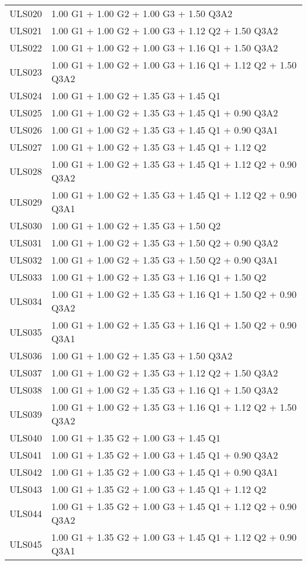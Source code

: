 \begin{center}
\begin{small}
\begin{longtable}{|l|p{10cm}|}
ULS020 & 1.00 G1 + 1.00 G2 + 1.00 G3 + 1.50 Q3A2\\
ULS021 & 1.00 G1 + 1.00 G2 + 1.00 G3 + 1.12 Q2 + 1.50 Q3A2\\
ULS022 & 1.00 G1 + 1.00 G2 + 1.00 G3 + 1.16 Q1 + 1.50 Q3A2\\
ULS023 & 1.00 G1 + 1.00 G2 + 1.00 G3 + 1.16 Q1 + 1.12 Q2 + 1.50 Q3A2\\
ULS024 & 1.00 G1 + 1.00 G2 + 1.35 G3 + 1.45 Q1\\
ULS025 & 1.00 G1 + 1.00 G2 + 1.35 G3 + 1.45 Q1 + 0.90 Q3A2\\
ULS026 & 1.00 G1 + 1.00 G2 + 1.35 G3 + 1.45 Q1 + 0.90 Q3A1\\
ULS027 & 1.00 G1 + 1.00 G2 + 1.35 G3 + 1.45 Q1 + 1.12 Q2\\
ULS028 & 1.00 G1 + 1.00 G2 + 1.35 G3 + 1.45 Q1 + 1.12 Q2 + 0.90 Q3A2\\
ULS029 & 1.00 G1 + 1.00 G2 + 1.35 G3 + 1.45 Q1 + 1.12 Q2 + 0.90 Q3A1\\
ULS030 & 1.00 G1 + 1.00 G2 + 1.35 G3 + 1.50 Q2\\
ULS031 & 1.00 G1 + 1.00 G2 + 1.35 G3 + 1.50 Q2 + 0.90 Q3A2\\
ULS032 & 1.00 G1 + 1.00 G2 + 1.35 G3 + 1.50 Q2 + 0.90 Q3A1\\
ULS033 & 1.00 G1 + 1.00 G2 + 1.35 G3 + 1.16 Q1 + 1.50 Q2\\
ULS034 & 1.00 G1 + 1.00 G2 + 1.35 G3 + 1.16 Q1 + 1.50 Q2 + 0.90 Q3A2\\
ULS035 & 1.00 G1 + 1.00 G2 + 1.35 G3 + 1.16 Q1 + 1.50 Q2 + 0.90 Q3A1\\
ULS036 & 1.00 G1 + 1.00 G2 + 1.35 G3 + 1.50 Q3A2\\
ULS037 & 1.00 G1 + 1.00 G2 + 1.35 G3 + 1.12 Q2 + 1.50 Q3A2\\
ULS038 & 1.00 G1 + 1.00 G2 + 1.35 G3 + 1.16 Q1 + 1.50 Q3A2\\
ULS039 & 1.00 G1 + 1.00 G2 + 1.35 G3 + 1.16 Q1 + 1.12 Q2 + 1.50 Q3A2\\
ULS040 & 1.00 G1 + 1.35 G2 + 1.00 G3 + 1.45 Q1\\
ULS041 & 1.00 G1 + 1.35 G2 + 1.00 G3 + 1.45 Q1 + 0.90 Q3A2\\
ULS042 & 1.00 G1 + 1.35 G2 + 1.00 G3 + 1.45 Q1 + 0.90 Q3A1\\
ULS043 & 1.00 G1 + 1.35 G2 + 1.00 G3 + 1.45 Q1 + 1.12 Q2\\
ULS044 & 1.00 G1 + 1.35 G2 + 1.00 G3 + 1.45 Q1 + 1.12 Q2 + 0.90 Q3A2\\
ULS045 & 1.00 G1 + 1.35 G2 + 1.00 G3 + 1.45 Q1 + 1.12 Q2 + 0.90 Q3A1\\

\end{longtable}
\end{small}
\end{center}
